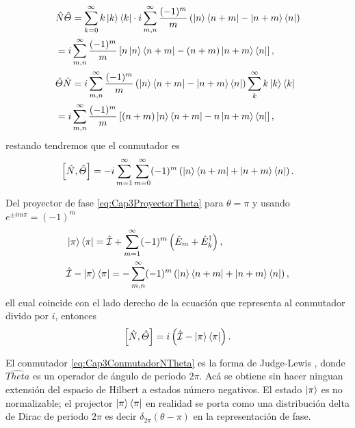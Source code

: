             \begin{align*}
                & \hat{N}\hat{\Theta} = \sum_{k=0}^{\infty} k \ket{k}\bra{k} \cdot i \sum_{m,n}^{\infty} \frac{(-1)^m}{m}\left(\ket{n}\bra{n+m} - \ket{n+m}\bra{n}\right)\\
                & = i\sum_{m,n}^{\infty}\frac{(-1)^m}{m}\left[n\ket{n}\bra{n+m} - (n+m)\ket{n+m}\bra{n} \right], \\
                & \hat{\Theta}\hat{N} = i \sum_{m,n}^{\infty} \frac{(-1)^m}{m}\left(\ket{n}\bra{n+m} - \ket{n+m}\bra{n}\right)\sum_{k}^{\infty} k \ket{k}\bra{k}\\
                & = i \sum_{m,n}^{\infty} \frac{(-1)^m}{m}\left[(n+m)\ket{n}\bra{n+m} - n\ket{n+m}\bra{n} \right],
            \end{align*}
            restando tendremos que el conmutador es
            \begin{equation}
                \left[\hat{N}, \hat{\Theta}\right] = -i \sum_{m=1}^{\infty}\sum_{m=0}^{\infty} (-1)^m \left(\ket{n}\bra{n+m} + \ket{n+m}\bra{n} \right).
            \end{equation}

            Del proyector de fase \ref{eq:Cap3ProyectorTheta} para $\theta = \pi$ y usando $e^{\pm im\pi} = (-1)^m$ 
            \begin{align*}
                & \ket{\pi}\bra{\pi} = \hat{\mathcal{I}} + \sum_{m=1}^{\infty} (-1)^m \left(\hat{E}_m + \hat{E}_k^\dagger \right),\\
                & \hat{\mathcal{I}} - \ket{\pi}\bra{\pi} = - \sum_{m,n}^{\infty} (-1)^m \left(\ket{n}\bra{n+m} + \ket{n+m}\bra{n} \right),
            \end{align*}
            ell cual coincide con el lado derecho de la ecuación que representa al conmutador divido por $i$, entonces
            \begin{equation}\label{eq:Cap3ConmutadorNTheta}
                \left[\hat{N}, \hat{\Theta}\right] = i \left(\hat{\mathcal{I}} - \ket{\pi}\bra{\pi} \right).
            \end{equation}

            El conmutador \ref{eq:Cap3ConmutadorNTheta} es la forma de Judge-Lewis \cite{judge1963commutator}, donde $\hat{Theta}$ es un operador de ángulo de periodo $2\pi$. Acá se obtiene sin hacer ninguan extensión del espacio de Hilbert a estados número negativos. El estado $\ket{\pi}$ es no normalizable; el projector $\ket{\pi}\bra{\pi}$ en realidad se porta como una distribución delta de Dirac de periodo $2\pi$ es decir $\delta_{2\pi}(\theta-\pi)$ en la representación de fase.

